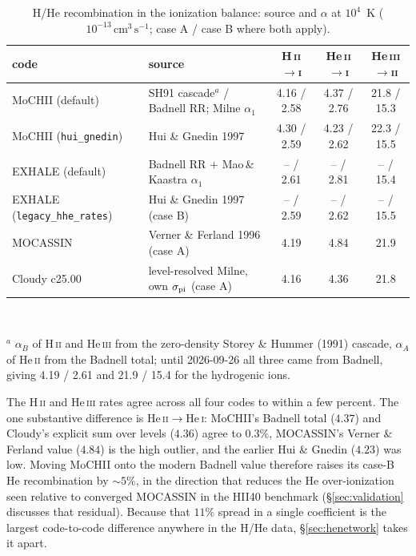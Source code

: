 \documentclass[english,a4paper]{my_memo}
\newcommand{\code}[1]{\texttt{#1}}
\newcommand{\cmc}{\mathrm{cm^{3}\,s^{-1}}}
\begin{document}
\begin{table}[htbp]
\centering\small
\caption{H/He recombination in the ionization balance: source and
$\alpha$ at $10^4$~K ($10^{-13}\,\cmc$; case A / case B where both
apply).}
\label{tab:codecmp}
\begin{tabular}{llccc}
\toprule
code & source & H\,\textsc{ii}$\to$\textsc{i}
     & He\,\textsc{ii}$\to$\textsc{i} & He\,\textsc{iii}$\to$\textsc{ii} \\
\midrule
MoCHII (default)          & SH91 cascade$^a$ / Badnell RR; Milne $\alpha_1$ & 4.16 / 2.58 & 4.37 / 2.76 & 21.8 / 15.3 \\
MoCHII (\code{hui\_gnedin})& Hui \& Gnedin 1997                        & 4.30 / 2.59 & 4.23 / 2.62 & 22.3 / 15.5 \\
EXHALE (default)           & Badnell RR $+$ Mao\,\&\,Kaastra $\alpha_1$ & -- / 2.61   & -- / 2.81   & -- / 15.4   \\
EXHALE (\code{legacy\_hhe\_rates}) & Hui \& Gnedin 1997 (case B)         & -- / 2.59   & -- / 2.62   & -- / 15.5   \\
MOCASSIN                   & Verner \& Ferland 1996 (case A)           & 4.19        & 4.84        & 21.9        \\
Cloudy c25.00              & level-resolved Milne, own $\sigma_{\rm pi}$ (case A) & 4.16 & 4.36 & 21.8 \\
\bottomrule
\end{tabular}\\[2pt]
\parbox{0.95\linewidth}{\raggedright\footnotesize $^a$ $\alpha_B$ of
H\,\textsc{ii} and He\,\textsc{iii} from the zero-density Storey \& Hummer
(1991) cascade, $\alpha_A$ of He\,\textsc{ii} from the Badnell total; until
2026-09-26 all three came from Badnell, giving 4.19 / 2.61 and 21.9 / 15.4
for the hydrogenic ions.}
\end{table}
The H\,\textsc{ii} and He\,\textsc{iii} rates agree across all four codes
to within a few percent.  The one substantive difference is
He\,\textsc{ii}$\to$He\,\textsc{i}: MoCHII's Badnell total ($4.37$) and
Cloudy's explicit sum over levels ($4.36$) agree to $0.3\%$, MOCASSIN's
Verner \& Ferland value ($4.84$) is the high outlier, and the earlier
Hui \& Gnedin ($4.23$) was low.  Moving MoCHII onto the modern Badnell
value therefore raises its case-B He recombination by $\sim5\%$, in the
direction that reduces the He over-ionization seen relative to converged
MOCASSIN in the HII40 benchmark (\S\ref{sec:validation} discusses that
residual).  Because that $11\%$ spread in a single coefficient is the
largest code-to-code difference anywhere in the H/He data, \S\ref{sec:henetwork}
takes it apart.
\end{document}
